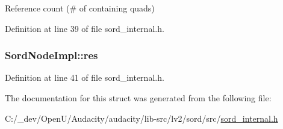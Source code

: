 Reference count (\# of containing quads) 



Definition at line 39 of file sord\+\_\+internal.\+h.

\subsubsection[{\texorpdfstring{res}{res}}]{ Sord\+Node\+Impl\+::res}\hypertarget{struct_sord_node_impl_aca9cba6462ce61f6db49069fb52df4e1}{}\label{struct_sord_node_impl_aca9cba6462ce61f6db49069fb52df4e1}


Definition at line 41 of file sord\+\_\+internal.\+h.



The documentation for this struct was generated from the following file\+:\begin{DoxyCompactItemize}
\item 
C\+:/\+\_\+dev/\+Open\+U/\+Audacity/audacity/lib-\/src/lv2/sord/src/\hyperlink{sord__internal_8h}{sord\+\_\+internal.\+h}\end{DoxyCompactItemize}
